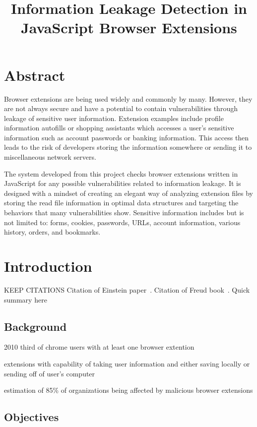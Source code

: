 \documentclass[jou,apacite]{apa6}
\title{Information Leakage Detection in JavaScript Browser Extensions}
\begin{document}
\maketitle    
                        
\section{Abstract}

Browser extensions are being used widely and commonly by many. However, they are not always secure and have a potential to contain vulnerabilities through leakage of sensitive user information. Extension examples include profile information autofills or shopping assistants which accesses a user's sensitive information such as account passwords or banking information. This access then leads to the risk of developers storing the information somewhere or sending it to miscellaneous network servers.

The system developed from this project checks browser extensions written in JavaScript for any possible vulnerabilities related to information leakage. It is designed with a mindset of creating an elegant way of analyzing extension files by storing the read file information in optimal data structures and targeting the behaviors that many vulnerabilities show. Sensitive information includes but is not limited to: forms, cookies, passwords, URLs, account information, various history, orders, and bookmarks.

\section{Introduction}

KEEP CITATIONS Citation of Einstein paper~\cite{Einstein}. Citation of Freud book~\cite{Freud}. Quick summary here

	\subsection{Background}

		2010 third of chrome users with at least one browser extention
	
		extensions with capability of taking user information and either saving locally or sending off of user's computer

		estimation of 85\% of organizations being affected by malicious browser extensions

	\subsection{Objectives}
\end{document}
